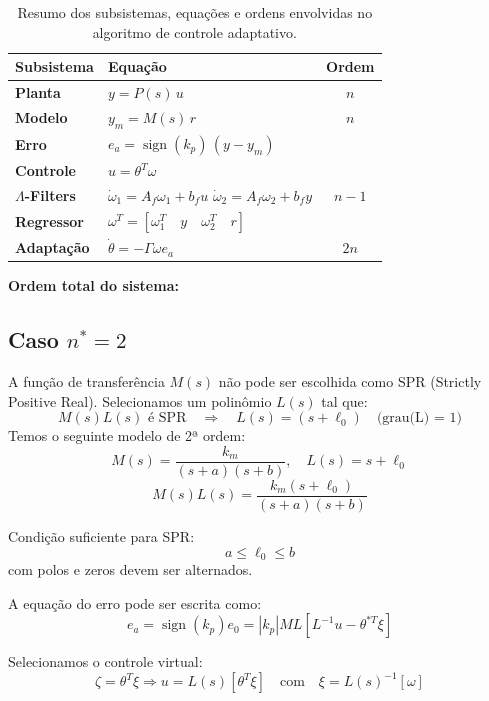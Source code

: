 \documentclass[10pt]{article}
\begin{document}
\begin{table}[htbp]
\centering
\renewcommand{\arraystretch}{1.4}
\begin{tabular}{|>{\bfseries}m{3cm}|m{8cm}|c|}
\hline
\textbf{Subsistema} & \textbf{Equação} & \textbf{Ordem} \\
\hline
Planta & $y = P(s)\, u$ & $n$ \\
\hline
Modelo & $y_m = M(s)\, r$ & $n$ \\
\hline
Erro & $e_a = \operatorname{sign}(k_p)\, (y - y_m)$ & \\
\hline
Controle & $u = \theta^T \omega$ & \\
\hline
$\Lambda$-Filters & $\dot{\omega}_1 = A_f \omega_1 + b_f u$ \newline $\dot{\omega}_2 = A_f \omega_2 + b_f y$ & $n - 1$ \\
\hline
Regressor & $\omega^T = \left[ \omega_1^T \quad y \quad \omega_2^T \quad r \right]$ & \\
\hline
Adaptação & $\dot{\theta} = -\Gamma \omega e_a$ & $2n$ \\
\hline
\end{tabular}
\caption{Resumo dos subsistemas, equações e ordens envolvidas no algoritmo de controle adaptativo.}
\label{tab:resumo_algoritmo1}
\end{table}

\vspace{1em}
\noindent
\textbf{Ordem total do sistema:} 

\subsection{Caso $n^* = 2$}

A função de transferência \( M(s) \) não pode ser escolhida como SPR (Strictly Positive Real).
Selecionamos um polinômio \( L(s) \) tal que:
\[
M(s) L(s) \text{ é SPR}
\quad \Rightarrow \quad L(s) = (s + \ell_0)
\quad \text{(grau(L) =  1)}
\]
Temos o seguinte modelo de 2ª ordem:
\[
M(s) = \frac{k_m}{(s+a)(s+b)}, \quad L(s) = s + \ell_0
\]
\[
M(s)L(s) = \frac{k_m(s + \ell_0)}{(s + a)(s + b)}
\]

Condição suficiente para SPR:
\[
a \leq \ell_0 \leq b
\]
com polos e zeros devem ser alternados.

A equação do erro pode ser escrita como:
\[
e_a = \operatorname{sign}(k_p) e_0 = |k_p| ML [L^{-1}u - \theta^{*T}\xi]
\]

Selecionamos o controle virtual:
\[
\zeta = \theta^T \xi \Rightarrow u = L(s)[\theta^T\xi]
\quad \text{com} \quad \xi = L(s)^{-1}[\omega]
\]
\end{document}
